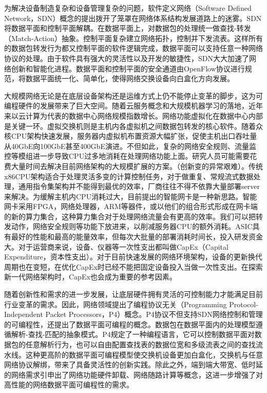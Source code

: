 为解决设备制造复杂和设备管理复杂的问题，软件定义网络（Software Defined Network，SDN）概念的提出拨开了笼罩在网络体系结构发展道路上的迷雾。SDN将数据平面和控制平面解耦。在数据平面上，对数据包的处理统一做查找-转发（Match-Action）抽象。控制平面复杂建立网络拓扑，控制并下发流表。这样所有的数据包转发行为都又控制平面的软件逻辑完成，数据平面可以支持任意一种网络协议的处理。由于软件具有强大的灵活性以及开发的敏捷性，SDN大大加速了网络创新和智能化进程。数据平面和控制平面的安全通道由OpenFlow协议进行规范，将数据平面统一化、简单化，使得网络交换设备向白盒化方向发展。	

大规模网络无论是在底层设备架构还是运维方式上仍不能停止变革的脚步，这为可编程硬件的发展带来了巨大空间。随着云服务概念和大规模机器学习的落地，近年来以云计算为代表的数据中心网络规模指数增长。网络功能虚拟化在数据中心内部是关键一环。虚拟交换机则是主机内各虚拟机之间数据包转发的核心软件。随着众核CPU架构快速发展，服务器内虚拟机布置资源大幅扩张，促使主机出口吞吐量从40GbE向100GbE甚至400GbE演进。不但如此，复杂的网络安全规则、流量监控等模组进一步导致CPU过多地消耗在处理网络功能上面。研究人员可能需要花费大量时间去解决目前网络架构的大规模扩展的方案。（创新变的异常艰难）。传统x86CPU架构适合于处理灵活多变的计算控制任务，对于做重复、常规流式数据处理，通用指令集架构并不能得到最优的效率，厂商往往不得不依靠大量部署server来解决。为缓解主机内CPU消耗过大，目前提出的智能网卡是一种新思路。智能网卡采用FPGA，网络处理器，ARM等器件，或以他们的组合形式形成在网卡端的新的算力集合，这种算力集合对于处理网络流量会有更高的效率。我们可以把转发动作，网络安全规则等功能下放进来，以削减服务器CPU的额外消耗。ASIC具有最好的性能和最高的能量效率，但每次大批量的部署消耗时间长，投入研发资金大。对于运营商来说，设备、仪器等一次性支出都叫做CapEx（Capital Expenditure，资本性支出）。对于目前快速发展的网络环境架构，设备的更新换代周期也在变短，在优化CapEx时已经不能把固定设备投入当做一次性支出。在探索新一代网络架构时，CapEx也会成为重要的参考因素。

随着创新性和需求的进一步发展，让底层硬件拥有灵活的可控制能力才能满足目前行业变革的需求。因此，网络领域提出了编程协议无关（Programming Protocol-Independent Packet Processors，P4）概念。P4协议不但支持SDN网络控制和管理的可编程性，还提出了数据平面可编程的概念。数据包在数据平面内的处理模型遵循解析-查找-匹配的抽象模式。P4规定了一种编程语言，它可以控制数据平面对数据包的任意解析行为，也可以自由配置查找表的数据位宽和多级流表之间的查找流水线。这种更高阶的数据平面可编程模型使交换机设备更加白盒化，交换机与任意网络协议解绑，带来了具备灵活性的创新实践。除此之外，端到端大带宽、低时延的网络需求引申出了网络功能硬件卸载、网络随路计算等概念，这进一步增强了对高性能的网络数据平面可编程性的需求。

